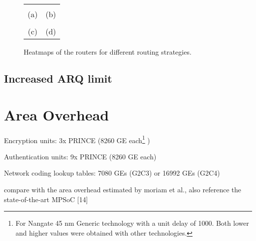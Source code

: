\begin{figure}
    \begin{tabular}{cc}
         &  \\
        (a) & (b) \\
         &  \\
        (c) & (d) \\
    \end{tabular}
    \caption[Heatmaps of the routers for different routing strategies]{Heatmaps of the routers for different routing strategies.}
    \label{fig:resultsroutingstratheatmaps}
\end{figure}

\subsection{Increased ARQ limit}

\section{Area Overhead}
Encryption units: 3x PRINCE (8260 GE each\footnote{For Nangate 45 nm Generic technology with a unit delay of 1000. Both lower and higher values were
obtained with other technologies.} \cite[16]{borghoff12prince})

Authentication units: 9x PRINCE (8260 GE each)

Network coding lookup tables: 7080 GEs (G2C3) or 16992 GEs (G2C4) \cite[5]{moriam18activeattackers}

compare with the area overhead estimated by moriam et al., also reference the state-of-the-art MPSoC [14]

\iffalse
"Results for IWA-NC confirm the alleged positive effect of NC in unreliable networks"

"Creation rate adjustment to keep the base injection rate constant is reflected in the differing information rates"

"IDA: 4 flits need to arrive unharmed for successful transmission unit, 3 for FGA, and 2 for IWA"

"NC proves to provide a performance improvement, although more in the sense of less residual errors than a decrease in latency since ARQs are still
limited to 1 per transmission unit across all variants."
\fi
